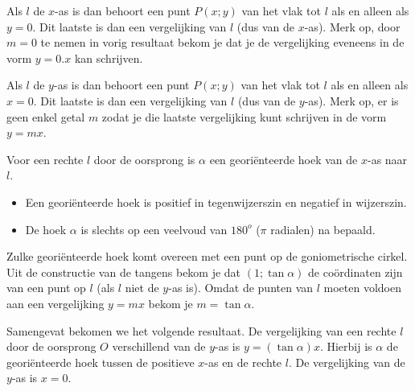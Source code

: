Als $l$ de $x$-as is dan behoort een punt $P(x;y)$ van het vlak tot $l$ als en alleen als $y=0$.
Dit laatste is dan een vergelijking van $l$ (dus van de $x$-as).
Merk op, door $m=0$ te nemen in vorig resultaat bekom je dat je de vergelijking eveneens in de vorm $y=0.x$ kan schrijven.

Als $l$ de $y$-as is dan behoort een punt $P(x;y)$ van het vlak tot $l$ als en alleen als $x=0$.
Dit laatste is dan een vergelijking van $l$ (dus van de $y$-as).
Merk op, er is geen enkel getal $m$ zodat je die laatste vergelijking kunt schrijven in de vorm $y=mx$.

Voor een rechte $l$ door de oorsprong is $\alpha$ een geori\"enteerde hoek van de $x$-as naar $l$.
\begin{itemize}
\item Een geori\"enteerde hoek is positief in tegenwijzerszin en negatief in wijzerszin.
\item De hoek $\alpha$ is slechts op een veelvoud van $180^o$ ($\pi$ radialen) na bepaald.
\end{itemize}

\begin{minipage}{.3\linewidth}
	\begin{center}
		
	\end{center}
\end{minipage}
\begin{minipage}{.3\linewidth}
	\begin{center}
	
\end{center}
\end{minipage}
\begin{minipage}{.3\linewidth}
	\begin{center}
	
\end{center}
\end{minipage}

Zulke geori\"enteerde hoek komt overeen met een punt op de goniometrische cirkel.
Uit de constructie van de tangens bekom je dat $(1; \tan \alpha)$ de co\"ordinaten zijn van een punt op $l$ (als $l$ niet de $y$-as is).
Omdat de punten van $l$ moeten voldoen aan een vergelijking $y=mx$ bekom je $m=\tan \alpha$.

Samengevat bekomen we het volgende resultaat.
De vergelijking van een rechte $l$ door de oorsprong $O$ verschillend van de $y$-as is $y=(\tan \alpha )x$.
Hierbij is $\alpha$ de geori\"enteerde hoek tussen de positieve $x$-as en de rechte $l$.
De vergelijking van de $y$-as is $x=0$.\\

